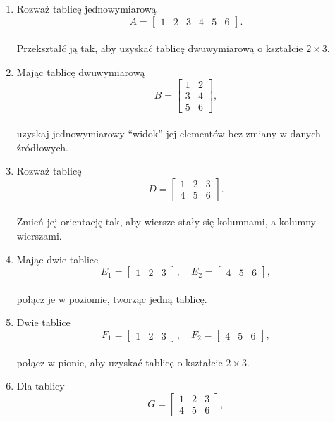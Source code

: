 \documentclass[
  polish,
  letterpaper,
  DIV=11,
  numbers=noendperiod]{scrreprt}
\begin{document}
\begin{enumerate}
\def\labelenumi{\arabic{enumi}.}
\item
  Rozważ tablicę jednowymiarową\\
  \[A = \begin{bmatrix}1 & 2 & 3 & 4 & 5 & 6\end{bmatrix}.\]\\
  Przekształć ją tak, aby uzyskać tablicę dwuwymiarową o kształcie
  \(2 \times 3\).
\item
  Mając tablicę dwuwymiarową\\
  \[B = \begin{bmatrix}1 & 2 \\ 3 & 4 \\ 5 & 6\end{bmatrix},\]\\
  uzyskaj jednowymiarowy ``widok'' jej elementów bez zmiany w danych
  źródłowych.
\item
  Rozważ tablicę\\
  \[D = \begin{bmatrix}1 & 2 & 3 \\ 4 & 5 & 6\end{bmatrix}.\]\\
  Zmień jej orientację tak, aby wiersze stały się kolumnami, a kolumny
  wierszami.
\item
  Mając dwie tablice\\
  \[E_1 = \begin{bmatrix}1 & 2 & 3\end{bmatrix}, \quad E_2 = \begin{bmatrix}4 & 5 & 6\end{bmatrix},\]\\
  połącz je w poziomie, tworząc jedną tablicę.
\item
  Dwie tablice\\
  \[F_1 = \begin{bmatrix}1 & 2 & 3\end{bmatrix}, \quad F_2 = \begin{bmatrix}4 & 5 & 6\end{bmatrix},\]\\
  połącz w pionie, aby uzyskać tablicę o kształcie \(2 \times 3\).
\item
  Dla tablicy\\
  \[G = \begin{bmatrix}1 & 2 & 3 \\ 4 & 5 & 6\end{bmatrix},\]\\

\end{enumerate}
\end{document}
